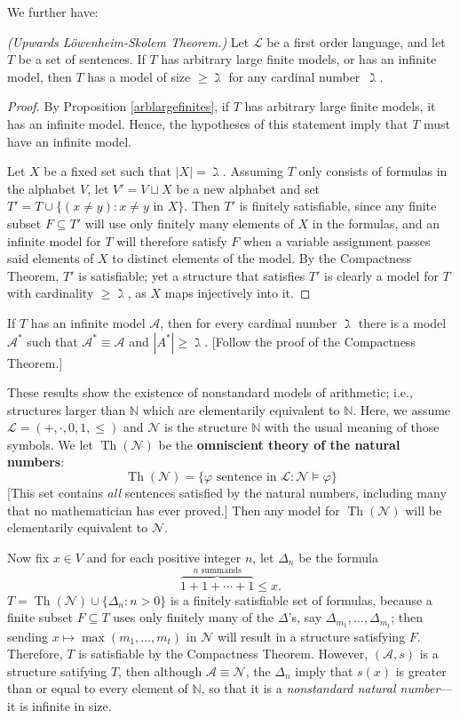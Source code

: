 \documentclass{article}
\def\A{\mathcal A}
\def\Lang{\mathcal L}
\def\Nat{\mathcal N}
\def\N{\mathbb N}
\def\Th{\operatorname{Th}}
\begin{document}
We further have:
\begin{theorem}\label{upwardsls}
\emph{(Upwards L\"owenheim-Skolem Theorem.)} Let $\Lang$ be a first order language, and let $T$ be a set of sentences.  If $T$ has arbitrary large finite models, or has an infinite model, then $T$ has a model of size $\ge\gimel$ for any cardinal number~$\gimel$.
\end{theorem}
\begin{proof}
By Proposition \ref{arblargefinites}, if $T$ has arbitrary large finite models, it has an infinite model.  Hence, the hypotheses of this statement imply that $T$ must have an infinite model.

Let $X$ be a fixed set such that $|X|=\gimel$.  Assuming $T$ only consists of formulas in the alphabet $V$, let $V'=V\sqcup X$ be a new alphabet and set $T'=T\cup\{(x\ne y):x\ne y\text{ in }X\}$.  Then $T'$ is finitely satisfiable, since any finite subset $F\subseteq T'$ will use only finitely many elements of $X$ in the formulas, and an infinite model for $T$ will therefore satisfy $F$ when a variable assignment passes said elements of $X$ to distinct elements of the model.  By the Compactness Theorem, $T'$ is satisfiable; yet a structure that satisfies $T'$ is clearly a model for $T$ with cardinality $\ge\gimel$, as $X$ maps injectively into it.
\end{proof}
\begin{exercise}\label{upwards2}
If $T$ has an infinite model $\A$, then for every cardinal number $\gimel$ there is a model $\A^*$ such that $\A^*\equiv\A$ and $|A^*|\ge\gimel$.  [Follow the proof of the Compactness Theorem.]
\end{exercise}

\noindent These results show the existence of nonstandard models of arithmetic; i.e., structures larger than $\N$ which are elementarily equivalent to $\N$.  Here, we assume $\Lang=(+,\cdot,0,1,\le)$ and $\Nat$ is the structure $\N$ with the usual meaning of those symbols.  We let $\Th(\Nat)$ be the \textbf{omniscient theory of the natural numbers}:
$$\Th(\Nat)=\{\varphi\text{ sentence in }\Lang:\Nat\models\varphi\}$$
[This set contains \emph{all} sentences satisfied by the natural numbers, including many that no mathematician has ever proved.]  Then any model for $\Th(\Nat)$ will be elementarily equivalent to $\Nat$.

Now fix $x\in V$ and for each positive integer $n$, let $\Delta_n$ be the formula
$$\overset{n\text{ summands}}{\overbrace{1+1+\cdots+1}}\le x.$$
$T=\Th(\Nat)\cup\{\Delta_n:n>0\}$ is a finitely satisfiable set of formulas, because a finite subset $F\subseteq T$ uses only finitely many of the $\Delta$'s, say $\Delta_{m_1},\dots,\Delta_{m_t}$; then sending $x\mapsto\max(m_1,\dots,m_t)$ in $\Nat$ will result in a structure satisfying $F$.  Therefore, $T$ is satisfiable by the Compactness Theorem.  However, $(\A,s)$ is a structure satifying $T$, then although $\A\equiv\Nat$, the $\Delta_n$ imply that $s(x)$ is greater than or equal to every element of $\N$, so that it is a \emph{nonstandard natural number}\----it is infinite in size.
\end{document}
